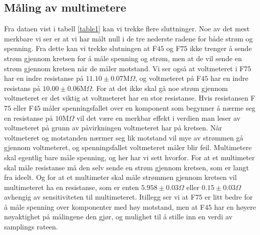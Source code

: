 \documentclass[%
 reprint,
nofootinbib,
aps,
]{revtex4-1}
\begin{document}
\subsection{Måling av multimetere}
Fra dataen vist i tabell \ref{table1} kan vi trekke flere sluttninger. Noe av det mest merkbare vi ser er at vi har målt null i de tre nederste radene for både strøm og spenning. Fra dette kan vi trekke slutningen at F$45$ og F$75$ ikke trenger å sende strøm gjennom kretsen for å måle spenning og strøm, men at de vil sende en strøm gjennom kretsen når de måler motstand. Vi ser også at voltmeteret i F$75$ har en indre resistanse på $11.10\pm0.07$M$\Omega$, og voltmeteret på F$45$ har en indre resistans på $10.00\pm0.06$M$\Omega$. For at det ikke skal gå noe strøm gjennom voltmeteret er det viktig at voltmeteret har en stor resistanse. Hvis resistansen F$75$ eller F$45$ måler spenningsfallet over en komponent som begynner å nærme seg en resistanse på $10$M$\Omega$ vil det være en merkbar effekt i verdien man leser av voltmeteret på grunn av påvirkningen voltmeteret har på kretsen. Når voltmeteret og motstanden nærmer seg lik motstand vil mye av strømmen gå gjennom voltmeteret, og spenningsfallet voltmeteret måler blir feil. Multimetere skal egentlig bare måle spenning, og her har vi sett hvorfor. For at et multimeter skal måle resistanse må den selv sende en strøm gjennom kretsen, som er langt fra ideelt. Og for at et multimeter skal måle strømmen gjennom kretsen vil multimeteret ha en resistanse, som er enten $5.958 \pm 0.03\Omega$ eller $0.15 \pm 0.03\Omega$ avhengig av sensitiviteten til multimeteret. Itillegg ser vi at F$75$ er litt bedre for å måle spenning over komponenter med høy motstand, men at F$45$ har en høyere nøyaktighet på målingene den gjør, og mulighet til å stille inn en verdi av samplings rateen.\\
\end{document}
